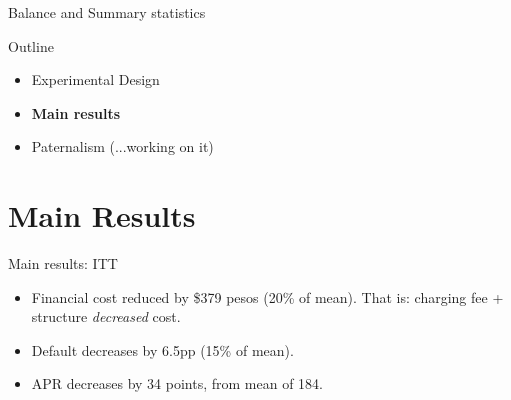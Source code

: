 \documentclass[8pt]{beamer}
\begin{document}
\begin{frame}{Balance and Summary statistics}
    \begin{table}[H]
\label{SS}
\begin{center}
\resizebox{.65\textwidth}{!}{
\scriptsize{}
}
\end{center}
\end{table}
\end{frame}


\begin{frame}{Outline}
     \begin{itemize}
         \vfill\item Experimental Design
         \vfill\item \textbf{Main results}
         \vfill\item Paternalism (...working on it)
     \end{itemize}
\end{frame}


\section{Main Results}
\begin{frame}{Main results: ITT}
\label{main_results}


\begin{itemize}
    \item Financial cost reduced by \$379 pesos (20\% of mean). That is: charging fee + structure \textit{decreased} cost.
    \item Default decreases by 6.5pp (15\% of mean).
    \item APR decreases by 34 points, from mean of 184.
\end{itemize}
\vspace{.3in}
\begin{table}[H]
\begin{center}
\resizebox{0.95\textwidth}{!}{
\small{}
}
\end{center}
\end{table}

   \vfill 
  \hyperlink{several_def_cost}{}

\end{frame}
\end{document}
